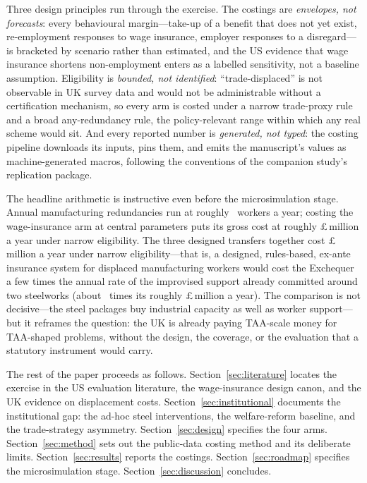 Three design principles run through the exercise. The costings are
\emph{envelopes, not forecasts}: every behavioural margin---take-up of a
benefit that does not yet exist, re-employment responses to wage
insurance, employer responses to a disregard---is bracketed by scenario
rather than estimated, and the US evidence that wage insurance shortens
non-employment \citep{hyman2024} enters as a labelled sensitivity, not a
baseline assumption. Eligibility is \emph{bounded, not identified}:
``trade-displaced'' is not observable in UK survey data and would not be
administrable without a certification mechanism, so every arm is costed
under a narrow trade-proxy rule and a broad any-redundancy rule, the
policy-relevant range within which any real scheme would sit. And every
reported number is \emph{generated, not typed}: the costing pipeline
downloads its inputs, pins them, and emits the manuscript's values as
machine-generated macros, following the conventions of the companion
study's replication package.

The headline arithmetic is instructive even before the microsimulation
stage. Annual manufacturing redundancies run at roughly
\TaaFlowManuf\ workers a year; costing the
wage-insurance arm at central parameters puts its gross cost at roughly
\pounds\TaaWageInsCostCentralNarrow\,million a year under narrow eligibility.
The three designed transfers together cost
\pounds\TaaTotalABCCentralNarrow\,million a year under narrow
eligibility---that is, a designed, rules-based, ex-ante insurance system
for displaced manufacturing workers would cost the Exchequer a few times
the annual rate of the improvised support already committed around two
steelworks (about \TaaABCMultipleSteelPerYear\ times its roughly
\pounds\TaaSteelPerYear\,million a year). The comparison is not decisive---the
steel packages buy industrial capacity as well as worker support---but it
reframes the question: the UK is already paying TAA-scale money for
TAA-shaped problems, without the design, the coverage, or the
evaluation that a statutory instrument would carry.

The rest of the paper proceeds as follows. Section~\ref{sec:literature}
locates the exercise in the US evaluation literature, the wage-insurance
design canon, and the UK evidence on displacement costs.
Section~\ref{sec:institutional} documents the institutional gap: the
ad-hoc steel interventions, the welfare-reform baseline, and the
trade-strategy asymmetry. Section~\ref{sec:design} specifies the four
arms. Section~\ref{sec:method} sets out the public-data costing method
and its deliberate limits. Section~\ref{sec:results} reports the
costings. Section~\ref{sec:roadmap} specifies the microsimulation stage.
Section~\ref{sec:discussion} concludes.
